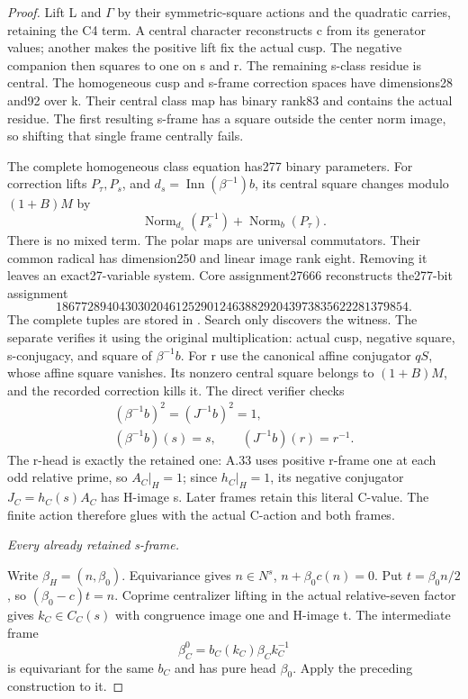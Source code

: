 \begin{proof}
Lift L and \(\Gamma\) by their symmetric-square actions and the
quadratic carries, retaining the C4 term. A central character
reconstructs c from its generator values; another makes the positive
lift fix the actual cusp. The negative companion then squares to
one on s and r. The remaining s-class residue is central. The
homogeneous cusp and s-frame correction spaces have dimensions28
and92 over k. Their central class map has binary rank83 and contains
the actual residue. The first resulting s-frame has a square outside
the center norm image, so shifting that single frame centrally fails.

The complete homogeneous class equation has277 binary parameters.
For correction lifts \(P_\tau,P_s\), and
\(d_s=\operatorname{Inn}(\beta^{-1})b\), its central square changes
modulo \((1+B)M\) by
\[
 \operatorname{Norm}_{d_s}(P_s^{-1})+
 \operatorname{Norm}_b(P_\tau).\tag{A.56.11}
\]
There is no mixed term. The polar maps are universal commutators.
Their common radical has dimension250 and linear image rank eight.
Removing it leaves an exact27-variable system. Core assignment27666
reconstructs the277-bit assignment
\[
 18677289404303020461252901246388292043973835622281379854.
 \tag{A.56.12}
\]
The complete tuples are stored in
. Search only discovers the
witness. The separate  verifies it
using the original multiplication: actual cusp, negative square,
s-conjugacy, and square of \(\beta^{-1}b\). For r use the canonical
affine conjugator \(qS\), whose affine square vanishes. Its nonzero
central square belongs to \((1+B)M\), and the recorded correction
kills it. The direct verifier checks
\[
 \begin{gathered}
 (\beta^{-1}b)^2=(J^{-1}b)^2=1,\\
 (\beta^{-1}b)(s)=s,\qquad(J^{-1}b)(r)=r^{-1}.
 \end{gathered}\tag{A.56.13}
\]
The r-head is exactly the retained one: A.33 uses positive r-frame
one at each odd relative prime, so \(A_C|_H=1\); since \(h_C|_H=1\),
its negative conjugator \(J_C=h_C(s)A_C\) has H-image s. Later
frames retain this literal C-value. The finite action therefore
glues with the actual C-action and both frames.

\emph{Every already retained s-frame.}\par
Write \(\beta_H=(n,\beta_0)\). Equivariance gives
\(n\in N^s\), \(n+\beta_0c(n)=0\). Put \(t=\beta_0n/2\),
so \((\beta_0-c)t=n\). Coprime centralizer lifting in the actual
relative-seven factor gives \(k_C\in C_C(s)\) with congruence image
one and H-image t. The intermediate frame
\[
 \beta_C^0=b_C(k_C)\beta_Ck_C^{-1}\tag{A.56.14}
\]
is equivariant for the same \(b_C\) and has pure head \(\beta_0\).
Apply the preceding construction to it.


\end{proof}

